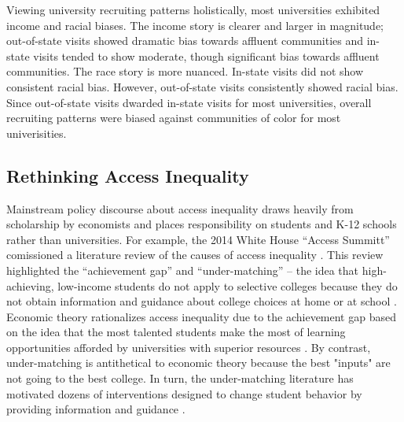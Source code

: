 \documentclass[twoside]{article}
\begin{document}
Viewing university recruiting patterns holistically, most universities exhibited income and racial biases. The income story is clearer and larger in magnitude; out-of-state visits showed dramatic bias towards affluent communities and in-state visits tended to show moderate, though significant bias towards affluent communities. The race story is more nuanced. In-state visits did not show consistent racial bias. However, out-of-state visits consistently showed racial bias. Since out-of-state visits dwarded in-state visits for most universities, overall recruiting patterns were biased against communities of color for most univerisities.

\subsection*{Rethinking Access Inequality}

Mainstream policy discourse about access inequality draws heavily from scholarship by economists and places responsibility on students and K-12 schools rather than universities. For example, the 2014 White House ``Access Summitt'' comissioned a literature review of the causes of access inequality \citep{RN4016}.  This review highlighted the ``achievement gap'' and ``under-matching'' -- the idea that high-achieving, low-income students do not apply to selective colleges because they do not obtain information and guidance about college choices at home or at school \citep{RN3699,RN3700}.  Economic theory rationalizes access inequality due to the achievement gap based on the idea that the most talented students make the most of learning opportunities afforded by universities with superior resources \citep{RN1549,RN2247,RN2402,RN1545}. By contrast, under-matching is antithetical to economic theory because the best "inputs" are not going to the best college. In turn, the under-matching literature has motivated dozens of interventions designed to change student behavior by providing information and guidance \citep[e.g., ][]{RN4352,RN4345,RN4351}.
\end{document}
